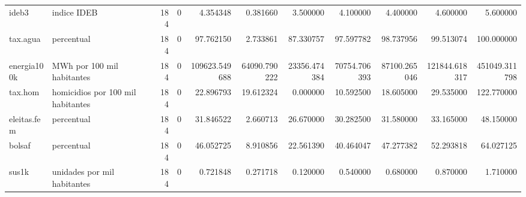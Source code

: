 \begin{table}
\begin{tabular}{llrrrrrrrrr}
ideb3 & indice IDEB & 184 & 0 & 4.354348 & 0.381660 & 3.500000 & 4.100000 & 4.400000 & 4.600000 & 5.600000 \\
tax.agua & percentual & 184 & 0 & 97.762150 & 2.733861 & 87.330757 & 97.597782 & 98.737956 & 99.513074 & 100.000000 \\
energia100k & MWh por 100 mil habitantes & 184 & 0 & 109623.549688 & 64090.790222 & 23356.474384 & 70754.706393 & 87100.265046 & 121844.618317 & 451049.311798 \\
tax.hom & homicidios por 100 mil habitantes & 184 & 0 & 22.896793 & 19.612324 & 0.000000 & 10.592500 & 18.605000 & 29.535000 & 122.770000 \\
eleitas.fem & percentual & 184 & 0 & 31.846522 & 2.660713 & 26.670000 & 30.282500 & 31.580000 & 33.165000 & 48.150000 \\
bolsaf & percentual & 184 & 0 & 46.052725 & 8.910856 & 22.561390 & 40.464047 & 47.277382 & 52.293818 & 64.027125 \\
sus1k & unidades por mil habitantes & 184 & 0 & 0.721848 & 0.271718 & 0.120000 & 0.540000 & 0.680000 & 0.870000 & 1.710000 \\
\bottomrule
\end{tabular}
\end{table}
